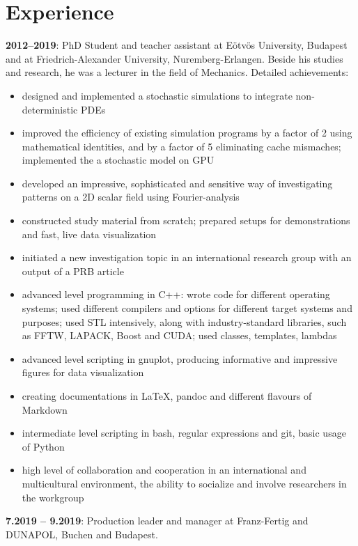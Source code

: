 \documentclass[10pt,a4paper,sans]{moderncv}        %
\begin{document}
\section{Experience}
\textbf{2012--2019}: PhD Student and teacher assistant at Eötvös University, Budapest and at Friedrich-Alexander University, Nuremberg-Erlangen. Beside his studies and research, he was a lecturer in the field of Mechanics. Detailed achievements:
\begin{itemize}
\item designed and implemented a stochastic simulations to integrate non-deterministic PDEs
\item improved the efficiency of existing simulation programs by a factor of 2 using mathematical identities, and by a factor of 5 eliminating cache mismaches; implemented the a stochastic model on GPU
\item developed an impressive, sophisticated and sensitive way of investigating patterns on a 2D scalar field using Fourier-analysis
\item constructed study material from scratch; prepared setups for demonstrations and fast, live data visualization
\item initiated a new investigation topic in an international research group with an output of a PRB article
\item advanced level programming in C++: wrote code for different operating systems; used different compilers and options for different target systems and purposes; used STL intensively, along with industry-standard libraries, such as FFTW, LAPACK, Boost and CUDA; used classes, templates, lambdas
\item advanced level scripting in gnuplot, producing informative and impressive figures for data visualization
\item creating documentations in LaTeX, pandoc and different flavours of Markdown
\item intermediate level scripting in bash, regular expressions and git, basic usage of Python
\item high level of collaboration and cooperation in an international and multicultural environment, the ability to socialize and involve researchers in the workgroup
\end{itemize}
\vspace{6pt}

\textbf{7.2019 -- 9.2019}: Production leader and manager at Franz-Fertig and DUNAPOL, Buchen and Budapest.
\end{document}
